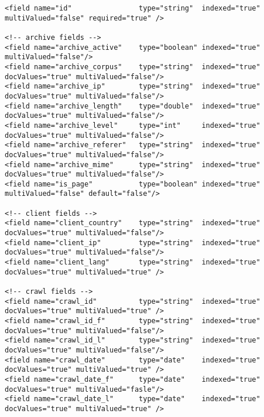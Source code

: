 \documentclass[symmetric,justified,marginals=raggedouter]{tufte-book}
\begin{document}
\begin{fullwidth}
\small
\begin{verbatim}
<field name="id"                type="string"  indexed="true"    multiValued="false" required="true" />

<!-- archive fields -->
<field name="archive_active"    type="boolean" indexed="true"    multiValued="false"/>
<field name="archive_corpus"    type="string"  indexed="true"    docValues="true" multiValued="false"/>
<field name="archive_ip"        type="string"  indexed="true"    docValues="true" multiValued="false"/>
<field name="archive_length"    type="double"  indexed="true"    docValues="true" multiValued="false"/>
<field name="archive_level"     type="int"     indexed="true"    docValues="true" multiValued="false"/>
<field name="archive_referer"   type="string"  indexed="true"    docValues="true" multiValued="false"/>
<field name="archive_mime"      type="string"  indexed="true"    docValues="true" multiValued="false"/>
<field name="is_page"           type="boolean" indexed="true"    multiValued="false" default="false"/>    

<!-- client fields -->
<field name="client_country"    type="string"  indexed="true"    docValues="true" multiValued="false"/>
<field name="client_ip"         type="string"  indexed="true"    docValues="true" multiValued="false"/>
<field name="client_lang"       type="string"  indexed="true"    docValues="true" multiValued="true" />

<!-- crawl fields -->
<field name="crawl_id"          type="string"  indexed="true"    docValues="true" multiValued="true" />
<field name="crawl_id_f"        type="string"  indexed="true"    docValues="true" multiValued="false"/>
<field name="crawl_id_l"        type="string"  indexed="true"    docValues="true" multiValued="false"/>
<field name="crawl_date"        type="date"    indexed="true"    docValues="true" multiValued="true" />
<field name="crawl_date_f"      type="date"    indexed="true"    docValues="true" multiValued="fasle"/>
<field name="crawl_date_l"      type="date"    indexed="true"    docValues="true" multiValued="true" />
\end{verbatim} 
\end{fullwidth}
\end{document}
